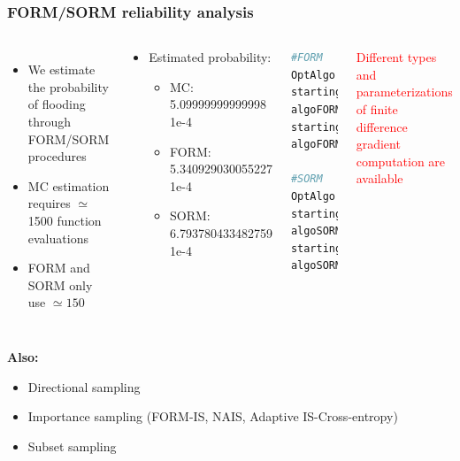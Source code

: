 \documentclass[aspectratio=169]{beamer}
\begin{document}

\begin{frame}[containsverbatim]
\frametitle{FORM/SORM reliability analysis}

\scriptsize{

\begin{columns}

\begin{itemize}

\item We estimate the probability of flooding through FORM/SORM procedures

\vspace{10pt}

\item MC estimation requires $\simeq$ 1500 function evaluations 
\item FORM and SORM only use $\simeq 150$
\end{itemize}

\begin{block}{}
\begin{itemize}
\item Estimated probability:
\begin{itemize}
\tiny
\item MC: 5.09999999999998 1e-4
\item FORM: 5.340929030055227 1e-4
\item SORM: 6.793780433482759 1e-4
\end{itemize}
\end{itemize}
\end{block}

    
\tiny 
\begin{lstlisting}[language=Python, numbers = none]
#FORM
OptAlgo = ot.Cobyla()
startingPoint = Distribution.getMean()
algoFORM = ot.FORM(OptAlgo, eventF, 
startingPoint)
algoFORM.run()

#SORM
OptAlgo = ot.Cobyla()
startingPoint = Distribution.getMean()
algoSORM = ot.SORM(OptAlgo, eventF, 
startingPoint)
algoSORM.run()
\end{lstlisting}

\scriptsize

\vspace{20pt}

\textcolor{red}{Different types and parameterizations of finite difference gradient computation are available}

\end{columns}

\textbf{Also:}

\begin{itemize}
\item Directional sampling
\item Importance sampling (FORM-IS, NAIS, Adaptive IS-Cross-entropy)
\item Subset sampling
\end{itemize}
}

\end{frame}
\end{document}
